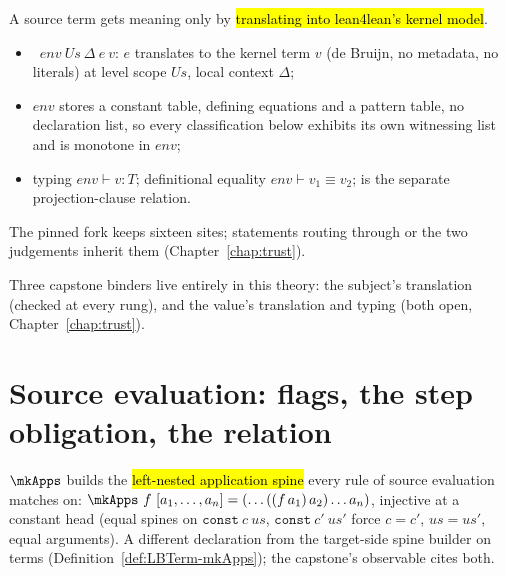 \begin{definition}
\label{def:lean4lean-grounding}
\leanok
{} A source term gets meaning only by \hl{translating into lean4lean's kernel model}.
\begin{itemize}
\item {}\ $env\ Us\ \Delta\ e\ v$: $e$ translates to the kernel term $v$ (de Bruijn, no
metadata, no literals) at level scope $Us$, local context $\Delta$;
\item $env$ stores a constant table, defining equations and a pattern table, no declaration list,
so every classification below exhibits its own witnessing list and is monotone in $env$;
\item typing $env \vdash v : T$; definitional equality $env \vdash v_1 \equiv v_2$; 
is the separate projection-clause relation.
\end{itemize}
 The pinned fork keeps sixteen  sites; statements routing through
\TrExprS{} or the two judgements inherit them (Chapter~\ref{chap:trust}).
\end{definition}

\begin{remark}
 Three capstone binders live entirely in this theory: the subject's translation
(checked at every rung), and the value's translation and typing (both open, Chapter~\ref{chap:trust}).
\end{remark}

\section{Source evaluation: flags, the step obligation, the relation}
\label{sec:source:seval}

\begin{definition}
\label{def:mkApps}
\leanok
{} $\mkApps$ builds the \hl{left-nested application spine} every rule of source
evaluation matches on: $\mkApps\ f\ [a_1,\dots,a_n] = (\dots((f\,a_1)\,a_2)\dots a_n)$, injective
at a constant head (equal spines on $\mathtt{const}\ c\ us$, $\mathtt{const}\ c'\ us'$ force
$c=c'$, $us=us'$, equal arguments).
 A different declaration from the target-side spine builder on \lbox{} terms
(Definition~\ref{def:LBTerm-mkApps}); the capstone's observable cites both.
\end{definition}

